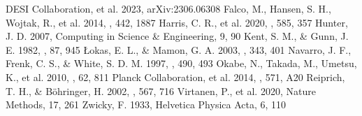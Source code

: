 \documentclass[twocolumn]{aastex631}
\begin{document}

\begin{thebibliography}{}
	 DESI Collaboration, et al. 2023, arXiv:2306.06308
	 Falco, M., Hansen, S. H., Wojtak, R., et al. 2014, \mnras, 442, 1887
	 Harris, C. R., et al. 2020, \nat, 585, 357
	 Hunter, J. D. 2007, Computing in Science \& Engineering, 9, 90
	 Kent, S. M., \& Gunn, J. E. 1982, \aj, 87, 945
	 Łokas, E. L., \& Mamon, G. A. 2003, \mnras, 343, 401
	 Navarro, J. F., Frenk, C. S., \& White, S. D. M. 1997, \apj, 490, 493
	 Okabe, N., Takada, M., Umetsu, K., et al. 2010, \pasj, 62, 811
	 Planck Collaboration, et al. 2014, \aap, 571, A20
	 Reiprich, T. H., \& Böhringer, H. 2002, \apj, 567, 716
	 Virtanen, P., et al. 2020, Nature Methods, 17, 261
	 Zwicky, F. 1933, Helvetica Physica Acta, 6, 110
\end{thebibliography}
\end{document}
